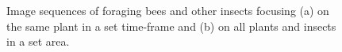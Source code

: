 \begin{figure}[!htbp]\myfloatalign
{} \\
 \\
\caption[Image sequences of foraging bees.]{Image sequences of foraging bees and other insects focusing (a) on the same plant in a set time-frame and (b) on all plants and insects in a set area.}\label{fig:seq-image}
\end{figure}

